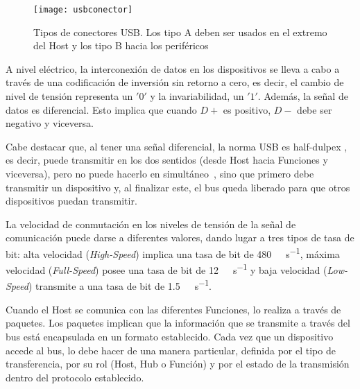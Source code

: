 \begin{figure}[ht]
	\centering
	\texttt{[image: usbconector]}
	\caption{Tipos de conectores USB. Los tipo A deben ser usados en el extremo del Host y los tipo B hacia los periféricos~\cite{USBHardwareWiki}}
	\label{fig:con}
\end{figure}

A nivel eléctrico, la interconexión de datos en los dispositivos se lleva a cabo a través de una codificación de inversión sin retorno a cero, es decir, el cambio de nivel de tensión representa un $'0'$ y la invariabilidad, un $'1'$. Además, la señal de datos es diferencial. Esto implica que cuando $D+$ es positivo, $D-$ debe ser negativo y viceversa.%

Cabe destacar que, al tener una señal diferencial, la norma USB es {half-dulpex \it}, es decir, puede transmitir en los dos sentidos (desde Host hacia Funciones y viceversa), pero no puede hacerlo en simultáneo~\cite{Riihonen2015}, sino que primero debe transmitir un dispositivo y, al finalizar este, el bus queda liberado para que otros dispositivos puedan transmitir.%

La velocidad de conmutación en los niveles de tensión de la señal de comunicación puede darse a diferentes valores, dando lugar a tres tipos de tasa de bit: alta velocidad ({\it High-Speed}) implica una tasa de bit de \SI{480}{\mega\bit\per\second}, máxima velocidad ({\it Full-Speed}) posee una tasa de bit de \SI{12}{\mega\bit\per\second} y baja velocidad ({\it Low-Speed}) transmite a una tasa de bit de \SI{1.5}{\mega\bit\per\second}.%

Cuando el Host se comunica con las diferentes Funciones, lo realiza a través de paquetes. Los paquetes implican que la información que se transmite a través del bus está encapsulada en un formato establecido. Cada vez que un dispositivo accede al bus, lo debe hacer de una manera particular, definida por el tipo de transferencia, por su rol (Host, Hub o Función) y por el estado de la transmisión dentro del protocolo establecido.